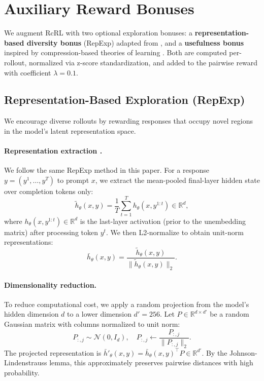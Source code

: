 \documentclass{article}
\theoremstyle{plain}
\theoremstyle{definition}
\theoremstyle{remark}
\begin{document}
\section{Auxiliary Reward Bonuses}
\label{app:auxiliary-rewards}

We augment RcRL with two optional exploration bonuses: a \textbf{representation-based diversity bonus} (RepExp) adapted from \citet{tuyls2025representationbasedexplorationlanguagemodels}, and a \textbf{usefulness bonus} inspired by compression-based theories of learning \citep{schmidhuber2010formal}. Both are computed per-rollout, normalized via z-score standardization, and added to the pairwise reward with coefficient $\lambda = 0.1$.

\subsection{Representation-Based Exploration (RepExp)}

We encourage diverse rollouts by rewarding responses that occupy novel regions in the model's latent representation space.

\paragraph{Representation extraction \citep{tuyls2025representationbasedexplorationlanguagemodels}.} We follow the same RepExp method in this paper. For a response $y = (y^1, \ldots, y^T)$ to prompt $x$, we extract the mean-pooled final-layer hidden state over completion tokens only:
\begin{equation}
\tilde{h}_\theta(x, y) = \frac{1}{T} \sum_{t=1}^{T} h_\theta(x, y^{1:t}) \in \mathbb{R}^d,
\end{equation}
where $h_\theta(x, y^{1:t}) \in \mathbb{R}^d$ is the last-layer activation (prior to the unembedding matrix) after processing token $y^t$. We then L2-normalize to obtain unit-norm representations:
\begin{equation}
\bar{h}_\theta(x, y) = \frac{\tilde{h}_\theta(x, y)}{\|\tilde{h}_\theta(x, y)\|_2}.
\end{equation}

\paragraph{Dimensionality reduction.} To reduce computational cost, we apply a random projection from the model's hidden dimension $d$ to a lower dimension $d' = 256$. Let $P \in \mathbb{R}^{d \times d'}$ be a random Gaussian matrix with columns normalized to unit norm:
\begin{equation}
P_{:,j} \sim \mathcal{N}(0, I_d), \quad P_{:,j} \leftarrow \frac{P_{:,j}}{\|P_{:,j}\|_2}.
\end{equation}
The projected representation is $\bar{h}'_\theta(x, y) = \bar{h}_\theta(x, y)^\top P \in \mathbb{R}^{d'}$. By the Johnson-Lindenstrauss lemma, this approximately preserves pairwise distances with high probability.
\end{document}
